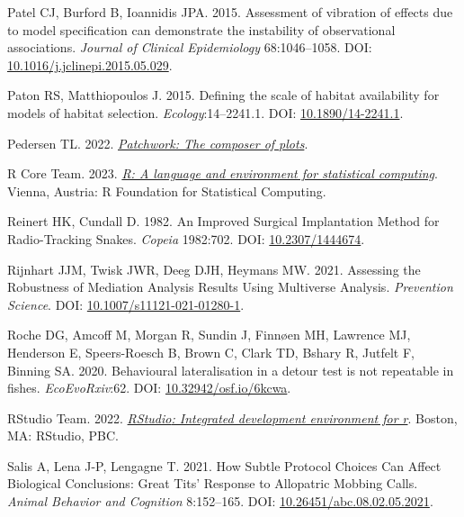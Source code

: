 \documentclass[10pt,a4paper]{article}
\newlength{\cslhangindent}
\newlength{\cslentryspacingunit} %
\newenvironment{CSLReferences}[2] %
 {%
  \setlength{\parindent}{0pt}
  \ifodd #1
  \let\oldpar\par
  \def\par{\hangindent=\cslhangindent\oldpar}
  \fi
  \setlength{\parskip}{#2\cslentryspacingunit}
 }%
 {}
\begin{document}
\begin{CSLReferences}{1}{0}
\leavevmode{}%
Patel CJ, Burford B, Ioannidis JPA. 2015. Assessment of vibration of effects due to model specification can demonstrate the instability of observational associations. \emph{Journal of Clinical Epidemiology} 68:1046--1058. DOI: \href{https://doi.org/10.1016/j.jclinepi.2015.05.029}{10.1016/j.jclinepi.2015.05.029}.

\leavevmode{}%
Paton RS, Matthiopoulos J. 2015. Defining the scale of habitat availability for models of habitat selection. \emph{Ecology}:14--2241.1. DOI: \href{https://doi.org/10.1890/14-2241.1}{10.1890/14-2241.1}.

\leavevmode{}%
Pedersen TL. 2022. \emph{\href{https://CRAN.R-project.org/package=patchwork}{Patchwork: The composer of plots}}.

\leavevmode{}%
R Core Team. 2023. \emph{\href{https://www.R-project.org/}{R: A language and environment for statistical computing}}. Vienna, Austria: R Foundation for Statistical Computing.

\leavevmode{}%
Reinert HK, Cundall D. 1982. An {Improved} {Surgical} {Implantation} {Method} for {Radio}-{Tracking} {Snakes}. \emph{Copeia} 1982:702. DOI: \href{https://doi.org/10.2307/1444674}{10.2307/1444674}.

\leavevmode{}%
Rijnhart JJM, Twisk JWR, Deeg DJH, Heymans MW. 2021. Assessing the {Robustness} of {Mediation} {Analysis} {Results} {Using} {Multiverse} {Analysis}. \emph{Prevention Science}. DOI: \href{https://doi.org/10.1007/s11121-021-01280-1}{10.1007/s11121-021-01280-1}.

\leavevmode{}%
Roche DG, Amcoff M, Morgan R, Sundin J, Finnøen MH, Lawrence MJ, Henderson E, Speers-Roesch B, Brown C, Clark TD, Bshary R, Jutfelt F, Binning SA. 2020. Behavioural lateralisation in a detour test is not repeatable in fishes. \emph{EcoEvoRxiv}:62. DOI: \href{https://doi.org/10.32942/osf.io/6kcwa}{10.32942/osf.io/6kcwa}.

\leavevmode{}%
RStudio Team. 2022. \emph{\href{http://www.rstudio.com/}{{RStudio}: Integrated development environment for r}}. Boston, MA: RStudio, PBC.

\leavevmode{}%
Salis A, Lena J-P, Lengagne T. 2021. How {Subtle} {Protocol} {Choices} {Can} {Affect} {Biological} {Conclusions}: {Great} {Tits}' {Response} to {Allopatric} {Mobbing} {Calls}. \emph{Animal Behavior and Cognition} 8:152--165. DOI: \href{https://doi.org/10.26451/abc.08.02.05.2021}{10.26451/abc.08.02.05.2021}.


\end{CSLReferences}
\end{document}
